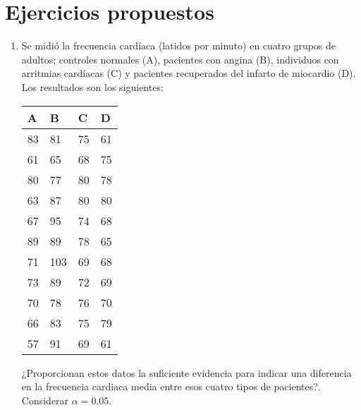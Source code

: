 \section{Ejercicios propuestos}
\begin{enumerate}[leftmargin=*]

\item Se midió la frecuencia cardíaca (latidos por minuto) en cuatro grupos de adultos; controles normales (A),
pacientes con angina (B), individuos con arritmias cardíacas (C) y pacientes recuperados del infarto de miocardio (D).
Los resultados son los siguientes:

\begin{center}
\begin{tabular}{llll}
A & B & C & D \\
\hline
83 & 81 & 75 & 61 \\
61 & 65 & 68 & 75 \\
80 & 77 & 80 & 78 \\
63 & 87 & 80 & 80 \\
67 & 95 & 74 & 68 \\
89 & 89 & 78 & 65 \\
71 & 103 & 69 & 68 \\
73 & 89 & 72 & 69 \\
70 & 78 & 76 & 70 \\
66 & 83 & 75 & 79 \\
57 & 91 & 69 & 61 \\
\hline
\end{tabular}
\end{center}

¿Proporcionan estos datos la suficiente evidencia para indicar una diferencia en la frecuencia cardiaca media entre esos
cuatro tipos de pacientes?. 
Considerar $\alpha=0.05$.



\end{enumerate}
